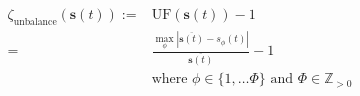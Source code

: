 \begin{equation}
	\begin{split}
		\zeta_\text{unbalance}(\textbf{s}(t)):=&\text{UF}(\textbf{s}(t)) - 1 \\
		=&\frac{\max_\phi\left|\overline{\textbf{s}(t)} - s_\phi(t)\right|}{\overline{\textbf{s}(t)}} - 1 \\
		&\text{where } \phi \in \{1, \dots \Phi\} \text{ and } \Phi \in \mathbb{Z}_{>0}
	\end{split}
	\label{ch1:equ:unbalance-cost}
\end{equation}
